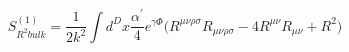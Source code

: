 \begin{equation}
S^{(1)}_{R^2 bulk}=\frac{1}{2k^2}\int d^D
x\frac{\alpha^\prime}{4}e^{\gamma\Phi}
\bigl(R^{\mu\nu\rho\sigma}R_{\mu\nu\rho\sigma}-4R^{\mu\nu}R_{\mu\nu}+R^2\bigr)
\label{bulk1}
\end{equation}

